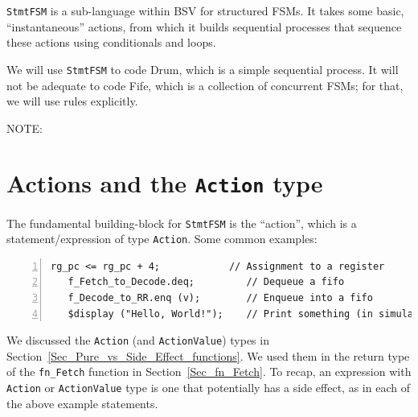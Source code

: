 
\verb|StmtFSM| is a sub-language within BSV for structured FSMs.  It
takes some basic, ``instantaneous'' actions, from which it builds
sequential processes that sequence these actions using conditionals
and loops.

We will use \verb|StmtFSM| to code Drum, which is a simple sequential
process.  It will not be adequate to code Fife, which is a collection
of concurrent FSMs; for that, we will use rules explicitly.

\vspace{2ex}

NOTE:


\section{Actions and the {\tt Action} type}


The fundamental building-block for \verb|StmtFSM| is the ``action'',
which is a statement/expression of type \verb|Action|.  Some common
examples:

{\small
\begin{Verbatim}[frame=single, numbers=left]
   rg_pc <= rg_pc + 4;            // Assignment to a register
   f_Fetch_to_Decode.deq;         // Dequeue a fifo
   f_Decode_to_RR.enq (v);        // Enqueue into a fifo
   $display ("Hello, World!");    // Print something (in simulation only)
\end{Verbatim}
}

We discussed the \verb|Action| (and \verb|ActionValue|) types in
Section~\ref{Sec_Pure_vs_Side_Effect_functions}.  We used them in the
return type of the \verb|fn_Fetch| function in
Section~\ref{Sec_fn_Fetch}.  To recap, an expression with
\verb|Action| or \verb|ActionValue| type is one that potentially has a
side effect, as in each of the above example statements.

